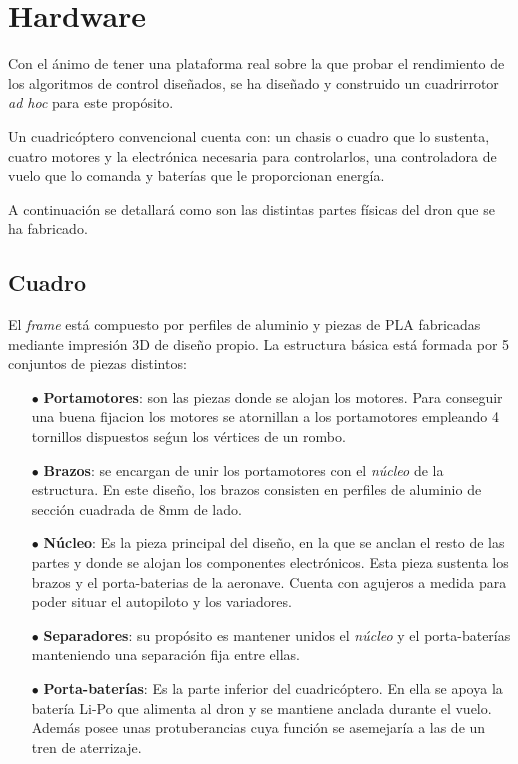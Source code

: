 \chapter{Hardware}

Con el ánimo de tener una plataforma real sobre la que probar el rendimiento de los algoritmos de control diseñados, se ha diseñado y construido un cuadrirrotor \textit{ad hoc} para este propósito.

Un cuadricóptero convencional cuenta con: un chasis o cuadro que lo sustenta, cuatro motores y la electrónica necesaria para controlarlos, una controladora de vuelo que lo comanda y baterías que le proporcionan energía.

A continuación se detallará como son las distintas partes físicas del dron que se ha fabricado.

\section{Cuadro}
El \textit{frame} está compuesto por perfiles de aluminio y piezas de PLA fabricadas mediante impresión 3D de diseño propio. La estructura básica está formada por 5 conjuntos de piezas distintos:
\begin{itemize}
	\item[$\bullet$] \textbf{Portamotores}: son las piezas donde se alojan los motores. Para conseguir una buena fijacion los motores se atornillan a los portamotores empleando 4 tornillos dispuestos seǵun los vértices de un rombo.
	
	
	\item [$\bullet$] \textbf{Brazos}: se encargan de unir los portamotores con el \textit{núcleo} de la estructura. En este diseño, los brazos consisten en perfiles de aluminio de sección cuadrada de 8mm de lado.
	
	\item [$\bullet$] \textbf{Núcleo}: Es la pieza principal del diseño, en la que se anclan el resto de las partes y donde se alojan los componentes electrónicos. Esta pieza sustenta los brazos y el porta-baterias de la aeronave. Cuenta con agujeros a medida para poder situar el autopiloto y los variadores.
	
	 
	\item [$\bullet$] \textbf{Separadores}: su propósito es mantener unidos el \textit{núcleo} y el porta-baterías manteniendo una separación fija entre ellas.
	
	
	\item [$\bullet$] \textbf{Porta-baterías}: Es la parte inferior del cuadricóptero. En ella se apoya la batería Li-Po que alimenta al dron y se mantiene anclada durante el vuelo. Además posee unas protuberancias cuya función se asemejaría a las de un tren de aterrizaje.  
	
	
	  
\end{itemize} 

